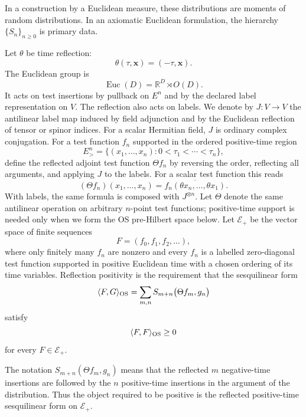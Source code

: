 In a construction by a Euclidean measure, these distributions are moments of
random distributions.  In an axiomatic Euclidean formulation, the hierarchy
\(\{S_n\}_{n\ge0}\) is primary data.

Let \(\theta\) be time reflection:
\[
  \theta(\tau,\mathbf x)=(-\tau,\mathbf x).
\]
The Euclidean group is
\[
  \operatorname{Euc}(D)=\mathbb R^D\rtimes O(D).
\]
It acts on test insertions by pullback on \(E^n\) and by the declared label
representation on \(V\).
The reflection also acts on labels.  We denote by \(J:V\to V\) the antilinear
label map induced by field adjunction and by the Euclidean reflection of
tensor or spinor indices.  For a scalar Hermitian field, \(J\) is ordinary
complex conjugation.  For a test function \(f_n\) supported in the ordered
positive-time region
\[
  E^n_>=\{(x_1,\ldots,x_n):0<\tau_1<\cdots<\tau_n\},
\]
define the reflected adjoint test function \(\Theta f_n\) by reversing the
order, reflecting all arguments, and applying \(J\) to the labels.  For a
scalar test function this reads
\[
  (\Theta f_n)(x_1,\ldots,x_n)
  =
  \overline{f_n(\theta x_n,\ldots,\theta x_1)}.
\]
With labels, the same formula is composed with \(J^{\otimes n}\).  Let
\(\Theta\) denote the same antilinear operation on arbitrary \(n\)-point test
functions; positive-time support is needed only when we form the OS
pre-Hilbert space below.  Let
\(\mathcal E_+\) be the vector space of finite sequences
\[
  F=(f_0,f_1,f_2,\ldots),
\]
where only finitely many \(f_n\) are nonzero and every \(f_n\) is a labelled
zero-diagonal test function supported in positive Euclidean time with a chosen
ordering of its time variables.  Reflection positivity is the requirement that the
sesquilinear form
\begin{equation}
  \langle F,G\rangle_{\rm OS}
  =
  \sum_{m,n} S_{m+n}\bigl(\Theta f_m,g_n\bigr)
  \label{eq:os-positive-time-form}
\end{equation}
satisfy
\begin{equation}
  \langle F,F\rangle_{\rm OS}\ge0
  \label{eq:os-reflection-positivity}
\end{equation}
for every \(F\in\mathcal E_+\).

The notation \(S_{m+n}(\Theta f_m,g_n)\) means that the reflected \(m\)
negative-time insertions are followed by the \(n\) positive-time insertions in
the argument of the distribution.  Thus the object required to be positive is
the reflected positive-time sesquilinear form on \(\mathcal E_+\).

